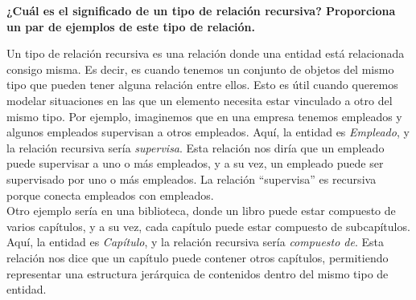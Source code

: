 \begin{center}
    \textbf{¿Cuál es el significado de un tipo de relación recursiva? Proporciona un par de ejemplos de este tipo de relación.}
\end{center}

\vspace{.3cm}

Un tipo de relación recursiva es una relación donde una entidad está relacionada consigo misma. Es decir, es cuando tenemos un conjunto de objetos del mismo tipo que pueden tener alguna relación entre ellos. Esto es útil cuando queremos modelar situaciones en las que un elemento necesita estar vinculado a otro del mismo tipo.  Por ejemplo, imaginemos que en una empresa tenemos empleados y algunos empleados supervisan a otros empleados. Aquí, la entidad es \textit{Empleado}, y la relación recursiva sería \textit{supervisa}. Esta relación nos diría que un empleado puede supervisar a uno o más empleados, y a su vez, un empleado puede ser supervisado por uno o más empleados. La relación “supervisa” es recursiva porque conecta empleados con empleados. \\

Otro ejemplo sería en una biblioteca, donde un libro puede estar compuesto de varios capítulos, y a su vez, cada capítulo puede estar compuesto de subcapítulos. Aquí, la entidad es \textit{Capítulo}, y la relación recursiva sería \textit{compuesto de}. Esta relación nos dice que un capítulo puede contener otros capítulos, permitiendo representar una estructura jerárquica de contenidos dentro del mismo tipo de entidad. \\

